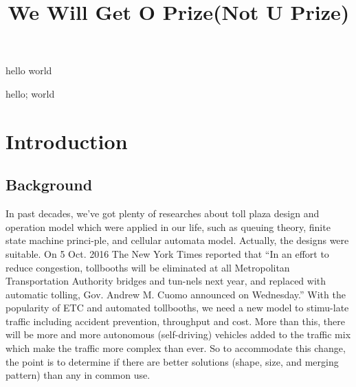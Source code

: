 \documentclass{mcmthesis}
\title{We Will Get O Prize(Not U Prize)}
\begin{document}
\begin{sheetsummary}
hello world
\end{sheetsummary}


\begin{keywords}
hello; world
\end{keywords}

\maketitle
 \tableofcontents
 \newpage


\section{Introduction}
    \subsection{Background}
     In past decades, we’ve got plenty of researches about toll plaza design and operation model which were applied in our life, such as queuing theory, finite state machine princi-ple, and cellular automata model. Actually,  the designs were suitable.
      On 5 Oct. 2016 The New York Times reported that “In an effort to reduce congestion, tollbooths will be eliminated at all Metropolitan Transportation Authority bridges and tun-nels next year, and replaced with automatic tolling, Gov. Andrew M. Cuomo announced on Wednesday.”
      With the popularity of ETC and automated tollbooths, we need a new model to stimu-late traffic including accident prevention, throughput and cost.
      More than this, there will be more and more autonomous (self-driving) vehicles added to the traffic mix which make the traffic more complex than ever.
      So to accommodate this change, the point is to determine if there are better solutions (shape, size, and merging pattern) than any in common use.
\end{document}
